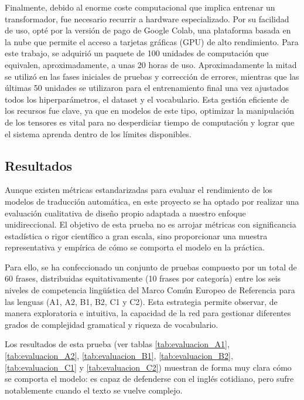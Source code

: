 Finalmente, debido al enorme coste computacional que implica entrenar un transformador, fue necesario recurrir a 
hardware especializado. Por su facilidad de uso, opté por la versión de pago de Google Colab, una plataforma basada en 
la nube que permite el acceso a tarjetas gráficas (GPU) de alto rendimiento. Para este trabajo, se adquirió un paquete 
de 100 unidades de computación que equivalen, aproximadamente, a unas 20 horas de uso. Aproximadamente la mitad se 
utilizó en las fases iniciales de pruebas y corrección de errores, mientras que las últimas 50 unidades se utilizaron 
para el entrenamiento final una vez ajustados todos los hiperparámetros, el dataset y el vocabulario. Esta gestión 
eficiente de los recursos fue clave, ya que en modelos de este tipo, optimizar la manipulación de los tensores es 
vital para no desperdiciar tiempo de computación y lograr que el sistema aprenda dentro de los límites disponibles.




\subsection{Resultados}

Aunque existen métricas estandarizadas para evaluar el rendimiento de los modelos de traducción automática, en este proyecto se ha optado por 
realizar una evaluación cualitativa de diseño propio adaptada a nuestro enfoque unidireccional. El objetivo de esta prueba no es arrojar métricas 
con significancia estadística o rigor científico a gran escala, sino proporcionar una muestra representativa y empírica de cómo se comporta 
el modelo en la práctica. 

Para ello, se ha confeccionado un conjunto de pruebas compuesto por un total de 60 frases, distribuidas equitativamente (10 frases por categoría) 
entre los seis niveles de competencia lingüística del Marco Común Europeo de Referencia para las lenguas (A1, A2, B1, B2, C1 y C2). 
Esta estrategia permite observar, de manera exploratoria e intuitiva, la capacidad de la red para gestionar diferentes grados de complejidad 
gramatical y riqueza de vocabulario.



Los resultados de esta prueba (ver tablas \ref{tab:evaluacion_A1}, \ref{tab:evaluacion_A2}, \ref{tab:evaluacion_B1}, \ref{tab:evaluacion_B2}, 
\ref{tab:evaluacion_C1} y \ref{tab:evaluacion_C2}) muestran de forma muy clara cómo se comporta el modelo: es capaz de defenderse con el 
inglés cotidiano, pero sufre notablemente cuando el texto se vuelve complejo. 


